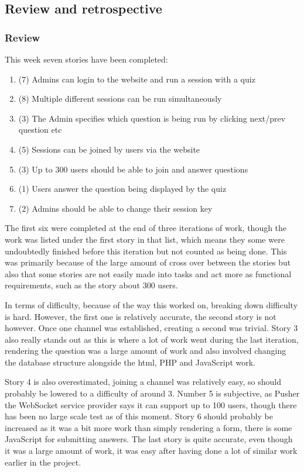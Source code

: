 \subsection{Review and retrospective}
\subsubsection{Review}
This week seven stories have been completed:
\begin{enumerate}
	\item (7) Admins can login to the website and run a session with a quiz
	\item (8) Multiple different sessions can be run simultaneously
	\item (3) The Admin specifies which question is being run by clicking next/prev question etc
	\item (5) Sessions can be joined by users via the website
	\item (3) Up to 300 users should be able to join and answer questions
	\item (1) Users answer the question being displayed by the quiz
	\item (2) Admins should be able to change their session key
\end{enumerate}
The first six were completed at the end of three iterations of work, though the work was listed under the first story in that list, which means they some were undoubtedly finished before this iteration but not counted as being done. This was primarily because of the large amount of cross over between the stories but also that some stories are not easily made into tasks and act more as functional requirements, such as the story about 300 users.

In terms of difficulty, because of the way this worked on, breaking down difficulty is hard. However, the first one is relatively accurate, the second story  is not however. Once one channel was established, creating a second was trivial. Story 3 also really stands out as this is where a lot of work went during the last iteration, rendering the question was a large amount of work and also involved changing the database structure alongside the html, PHP and JavaScript work. 

Story 4 is also overestimated, joining a channel was relatively easy, so should probably be lowered to a difficulty of around 3. Number 5 is subjective, as Pusher the WebSocket service provider says it can support up to 100 users, though there has been no large scale test as of this moment. Story 6 should probably be increased as it was a bit more work than simply rendering a form, there is some JavaScript for submitting answers. The last story is quite accurate, even though it was a large amount of work, it was easy after having done a lot of similar work earlier in the project.

